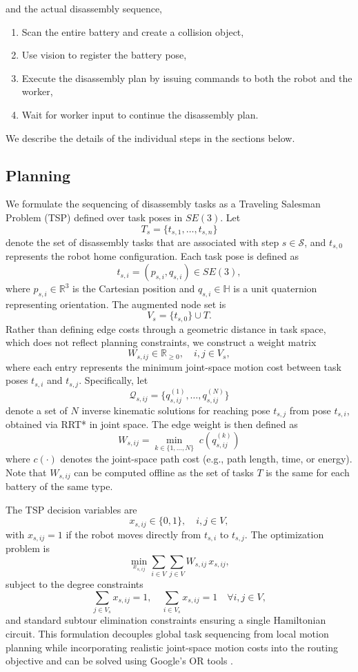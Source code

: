 \documentclass[letterpaper, 10 pt, conference]{ieeeconf}  %
\begin{document}
and the actual disassembly sequence,

\begin{enumerate}
\item Scan the entire battery and create a collision object,
\item Use vision to register the battery pose,
\item Execute the disassembly plan by issuing commands to both the robot and the worker,
\item Wait for worker input to continue the disassembly plan.
\end{enumerate}

We describe the details of the individual steps in the sections below.

\subsection{Planning}\label{sec:planning}
We formulate the sequencing of disassembly tasks as a Traveling Salesman Problem (TSP) defined over task poses in $SE(3)$. Let 
$$
T_s = \{t_{s,1}, \dots, t_{s,n}\}
$$
denote the set of disassembly tasks that are associated with step $s \in \mathcal{S}$, and $t_{s,0}$ represents the robot home configuration. Each task pose is defined as
$$
t_{s,i} = (p_{s,i}, q_{s,i}) \in SE(3),
$$
where $p_{s,i} \in \mathbb{R}^3$ is the Cartesian position and $q_{s,i} \in \mathbb{H}$ is a unit quaternion representing orientation. The augmented node set is
$$
V_s = \{t_{s,0}\} \cup T.
$$
Rather than defining edge costs through a geometric distance in task space, which does not reflect planning constraints, we construct a weight matrix
$$
W_{s,ij} \in \mathbb{R}_{\ge 0}, \quad i,j \in V_s,
$$
where each entry represents the minimum joint-space motion cost between task poses $t_{s,i}$ and $t_{s,j}$. Specifically, let
$$
\mathcal{Q}_{s,ij} = \{ q_{s,ij}^{(1)}, \dots, q_{s,ij}^{(N)} \}
$$
denote a set of $N$ inverse kinematic solutions for reaching pose $t_{s,j}$ from pose $t_{s,i}$, obtained via RRT* in joint space. The edge weight is then defined as
$$
W_{s,ij} = \min_{k \in \{1,\dots,N\}} \; c\!\left(q_{s,ij}^{(k)}\right)
$$
where $c(\cdot)$ denotes the joint-space path cost (e.g., path length, time, or energy). Note that $W_{s,ij}$ can be computed offline as the set of tasks $T$ is the same for each battery of the same type. 

The TSP decision variables are
$$
x_{s,ij} \in \{0,1\}, \quad i,j \in V,
$$
with $x_{s,ij}=1$ if the robot moves directly from $t_{s,i}$ to $t_{s,j}$. The optimization problem is
$$
\min_{x_{s,ij}} \sum_{i \in V} \sum_{j \in V} W_{s,ij} \, x_{s,ij},
$$
subject to the degree constraints
$$
\sum_{j \in V_s} x_{s,ij} = 1,  \quad
\sum_{i \in V_s} x_{s,ij} = 1 \quad \forall i,j \in V,
$$
and standard subtour elimination constraints ensuring a single Hamiltonian circuit. This formulation decouples global task sequencing from local motion planning while incorporating realistic joint-space motion costs into the routing objective and can be solved using Google's OR tools \cite{cuvelier2023or}.
\end{document}
